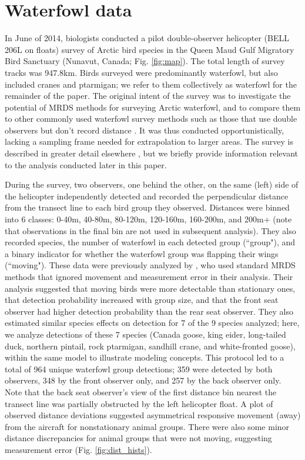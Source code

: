 \documentclass[aoas,preprint]{imsart}
\numberwithin{equation}{section}
\theoremstyle{plain}
\begin{document}
\section{Waterfowl data}

In June of 2014, biologists conducted a pilot double-observer helicopter (BELL 206L on floats) survey of Arctic bird species in the Queen Maud Gulf Migratory Bird Sanctuary (Nunavut, Canada; Fig. \ref{fig:map}). The total length of survey tracks was 947.8km.  Birds surveyed were predominantly waterfowl, but also included cranes and ptarmigan; we refer to them collectively as waterfowl for the remainder of the paper. The original intent of the survey was to investigate the potential of MRDS methods for surveying Arctic waterfowl, and to compare them to other commonly used waterfowl survey methods such as those that use double observers but don't record distance \citep[e.g.][]{KoneffEtAl2008}.  It was thus conducted opportunistically, lacking a sampling frame needed for extrapolation to larger areas.
The survey is described in greater detail elsewhere \citep{AlisauskasConn2017}, but we briefly provide information relevant to the analysis conducted later in this paper.

During the survey, two observers, one behind the other, on the same (left) side of the helicopter independently detected and recorded the perpendicular distance from the transect line to each bird group they observed.  Distances were binned into 6 classes: 0-40m, 40-80m, 80-120m, 120-160m, 160-200m, and 200m+ (note that observations in the final bin are not used in subsequent analysis).  They also recorded species, the number of waterfowl in each detected group (``group"), and a binary indicator for whether the waterfowl group was flapping their wings (``moving").  These data were previously analyzed by \citet{AlisauskasConn2017}, who used standard MRDS methods that ignored movement and measurement error in their analysis.  Their analysis suggested that moving birds were more detectable than stationary ones, that detection probability increased with group size, and that the front seat observer had higher detection probability than the rear seat observer.  They also estimated similar species effects on detection for 7 of the 9 species analyzed; here, we analyze detections of these 7 species (Canada goose, king eider, long-tailed duck, northern pintail, rock ptarmigan, sandhill crane, and white-fronted goose), within the same model to illustrate modeling concepts.  This protocol led to a total of 964 unique waterfowl group detections; 359 were detected by both observers, 348 by the front observer only, and 257 by the back observer only.  Note that the back seat observer's view of the first distance bin nearest the transect line was partially obstructed by the left helicopter float.  A plot of observed distance deviations suggested asymmetrical responsive movement (away) from the aircraft for nonstationary animal groups.  There were also some minor distance discrepancies for animal groups that were not moving, suggesting measurement error (Fig. \ref{fig:dist_hists}).
\end{document}
